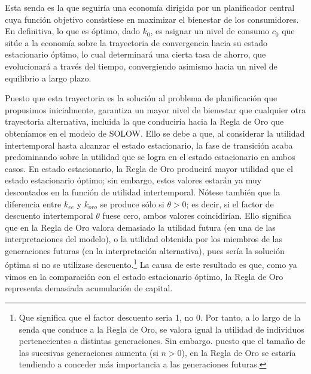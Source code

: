 \documentclass[10pt,a4paper]{article}
\begin{document}
Esta senda es la que seguiría una economía dirigida por un planificador central cuya función objetivo consistiese en maximizar el bienestar de los consumidores. En definitiva, lo que es óptimo, dado $k_0$, es asignar un nivel de consumo $c_0$ que sitúe a la economía sobre la trayectoria de convergencia hacia su estado estacionario óptimo, lo cual determinará una cierta tasa de ahorro, que evolucionará a través del tiempo, convergiendo asimismo hacia un nivel de equilibrio a largo plazo. 

Puesto que esta trayectoria es la solución al problema de planificación que propusimos inicialmente, garantiza un mayor nivel de bienestar que cualquier otra trayectoria alternativa, incluida la que conduciría hacia la Regla de Oro que obteníamos en el modelo de SOLOW. Ello se debe a que, al considerar la utilidad intertemporal  hasta alcanzar el estado estacionario, la fase de transición acaba predominando sobre la utilidad que se logra en el estado estacionario en ambos casos. En estado estacionario, la Regla de Oro producirá mayor utilidad que el estado estacionario óptimo; sin embargo, estos valores estarán ya muy descontados en la función de utilidad intertemporal. Nótese también que la diferencia entre $k_{ee}$ y $k_{oro}$ se produce sólo si $\theta>0$; es decir, si el factor de descuento intertemporal $\theta$ fuese cero, ambos valores coincidirían. Ello significa que en la Regla de Oro valora demasiado la utilidad futura (en una de las interpretaciones del modelo), o la utilidad obtenida por los miembros de las generaciones futuras (en la interpretación alternativa), pues sería la solución óptima si no se utilizase descuento.\footnote{%
    Que significa que el factor descuento seria 1, no 0. Por tanto, a lo largo de la senda que conduce a la Regla de Oro, se valora igual la utilidad de individuos pertenecientes a distintas generaciones. Sin embargo. puesto que el tamaño de las sucesivas generaciones aumenta (si $n>0$), en la Regla de Oro se estaría tendiendo a conceder más importancia a las generaciones futuras.
} La causa de este resultado es que, como ya vimos en la comparación con el estado estacionario óptimo, la Regla de Oro representa demasiada acumulación de capital.
\end{document}
